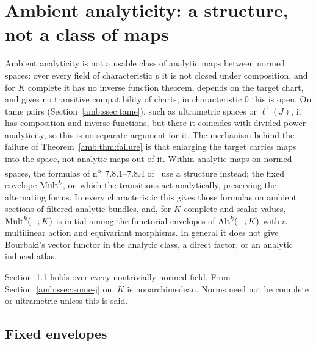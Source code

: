 \section{Ambient analyticity: a structure, not a class of maps}\label{amb:sec}

Ambient analyticity is not a usable class of analytic maps between normed spaces: over every field of characteristic $p$ it is not closed under composition, and for $K$ complete it has no inverse function theorem, depends on the target chart, and gives no transitive compatibility of charts; in characteristic $0$ this is open. On tame pairs (Section~\ref{amb:ssec:tame}), such as ultrametric spaces or $\ell^1(J)$, it has composition and inverse functions, but there it coincides with divided-power analyticity, so this is no separate argument for it. The mechanism behind the failure of Theorem~\ref{amb:thm:failure} is that enlarging the target carries maps into the space, not analytic maps out of it. Within analytic maps on normed spaces, the formulas of n\textsuperscript{o}~7.8.1--7.8.4 of~\cite{Bou} use a structure instead: the fixed envelope $\operatorname{Mult}^k$, on which the transitions act analytically, preserving the alternating forms. In every characteristic this gives those formulas on ambient sections of filtered analytic bundles, and, for $K$ complete and scalar values, $\operatorname{Mult}^k(-;K)$ is initial among the functorial envelopes of $\operatorname{Alt}^k(-;K)$ with a multilinear action and equivariant morphisms. In general it does not give Bourbaki's vector functor in the analytic class, a direct factor, or an analytic induced atlas.

Section~\ref{amb:ssec:fixed} holds over every nontrivially normed field. From Section~\ref{amb:ssec:some-j} on, $K$ is nonarchimedean. Norms need not be complete or ultrametric unless this is said.

\subsection{Fixed envelopes}\label{amb:ssec:fixed}

